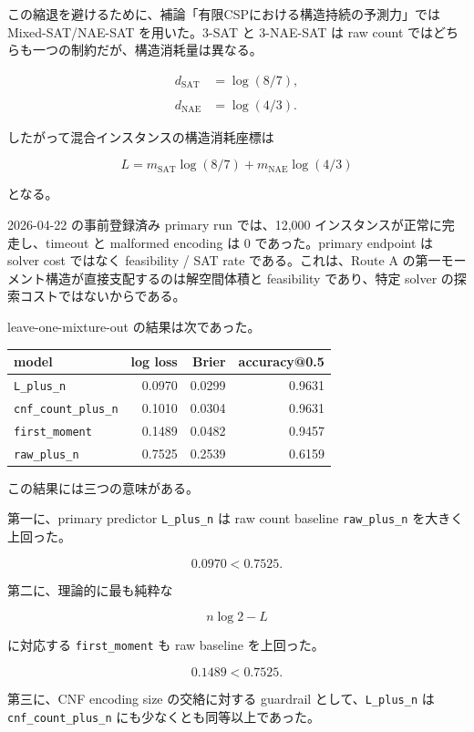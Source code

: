 \documentclass[12pt,a4paper]{article}
\begin{document}
この縮退を避けるために、補論「有限CSPにおける構造持続の予測力」では Mixed-SAT/NAE-SAT を用いた。3-SAT と 3-NAE-SAT は raw count ではどちらも一つの制約だが、構造消耗量は異なる。

\[
\begin{aligned}
d_{\mathrm{SAT}}&=\log(8/7), \\
\qquad \\
d_{\mathrm{NAE}}&=\log(4/3).
\end{aligned}
\]

したがって混合インスタンスの構造消耗座標は

\[
L = m_{\mathrm{SAT}}\log(8/7) + m_{\mathrm{NAE}}\log(4/3)
\]

となる。

2026-04-22 の事前登録済み primary run では、12,000 インスタンスが正常に完走し、timeout と malformed encoding は 0 であった。primary endpoint は solver cost ではなく feasibility / SAT rate である。これは、Route A の第一モーメント構造が直接支配するのは解空間体積と feasibility であり、特定 solver の探索コストではないからである。

leave-one-mixture-out の結果は次であった。

{\def\LTcaptype{table} %
\begin{longtable}[]{@{}lrrr@{}}
\toprule\noalign{}
model & log loss & Brier & accuracy@0.5 \\
\midrule\noalign{}
\endhead
\bottomrule\noalign{}
\endlastfoot
\texttt{L\_plus\_n} & 0.0970 & 0.0299 & 0.9631 \\
\texttt{cnf\_count\_plus\_n} & 0.1010 & 0.0304 & 0.9631 \\
\texttt{first\_moment} & 0.1489 & 0.0482 & 0.9457 \\
\texttt{raw\_plus\_n} & 0.7525 & 0.2539 & 0.6159 \\
\end{longtable}
}

この結果には三つの意味がある。

第一に、primary predictor \texttt{L\_plus\_n} は raw count baseline \texttt{raw\_plus\_n} を大きく上回った。

\[
0.0970 < 0.7525.
\]

第二に、理論的に最も純粋な

\[
n\log 2-L
\]

に対応する \texttt{first\_moment} も raw baseline を上回った。

\[
0.1489 < 0.7525.
\]

第三に、CNF encoding size の交絡に対する guardrail として、\texttt{L\_plus\_n} は \texttt{cnf\_count\_plus\_n} にも少なくとも同等以上であった。
\end{document}
